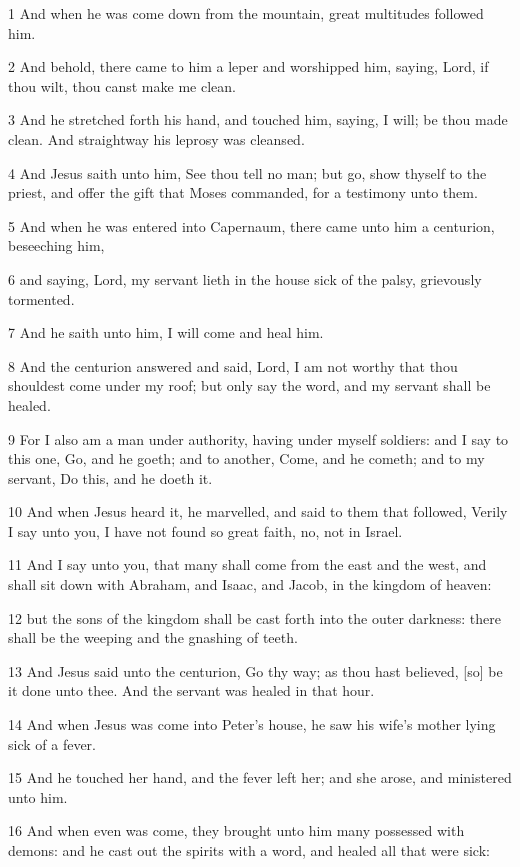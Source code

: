 \par 1 And when he was come down from the mountain, great multitudes followed him.
\par 2 And behold, there came to him a leper and worshipped him, saying, Lord, if thou wilt, thou canst make me clean.
\par 3 And he stretched forth his hand, and touched him, saying, I will; be thou made clean. And straightway his leprosy was cleansed.
\par 4 And Jesus saith unto him, See thou tell no man; but go, show thyself to the priest, and offer the gift that Moses commanded, for a testimony unto them.
\par 5 And when he was entered into Capernaum, there came unto him a centurion, beseeching him,
\par 6 and saying, Lord, my servant lieth in the house sick of the palsy, grievously tormented.
\par 7 And he saith unto him, I will come and heal him.
\par 8 And the centurion answered and said, Lord, I am not worthy that thou shouldest come under my roof; but only say the word, and my servant shall be healed.
\par 9 For I also am a man under authority, having under myself soldiers: and I say to this one, Go, and he goeth; and to another, Come, and he cometh; and to my servant, Do this, and he doeth it.
\par 10 And when Jesus heard it, he marvelled, and said to them that followed, Verily I say unto you, I have not found so great faith, no, not in Israel.
\par 11 And I say unto you, that many shall come from the east and the west, and shall sit down with Abraham, and Isaac, and Jacob, in the kingdom of heaven:
\par 12 but the sons of the kingdom shall be cast forth into the outer darkness: there shall be the weeping and the gnashing of teeth.
\par 13 And Jesus said unto the centurion, Go thy way; as thou hast believed, [so] be it done unto thee. And the servant was healed in that hour.
\par 14 And when Jesus was come into Peter's house, he saw his wife's mother lying sick of a fever.
\par 15 And he touched her hand, and the fever left her; and she arose, and ministered unto him.
\par 16 And when even was come, they brought unto him many possessed with demons: and he cast out the spirits with a word, and healed all that were sick:
